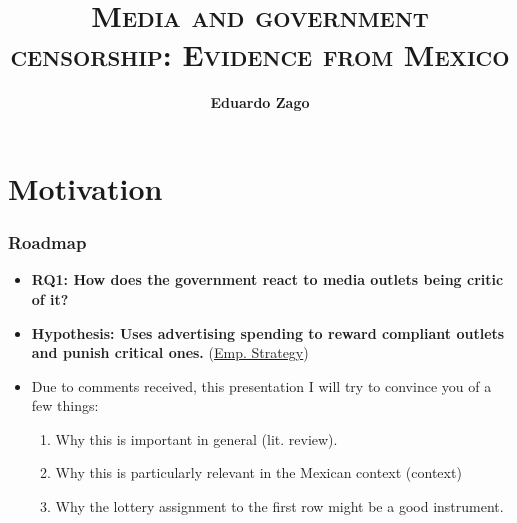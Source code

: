 \documentclass[12pt]{beamer}
\title{\Large\textsc{Media and government censorship: Evidence from Mexico}}
\author[Zago] %
{\textbf{Eduardo Zago}\inst{1}  \vspace{10pt}}
\institute []%
{  \inst{1}   PhD Student NYU Politics}
\date{\textsc{}}
\begin{document}
\maketitle









\section{Motivation}


\begin{frame}
\frametitle{Roadmap}
\label{slide:intro}
\small

\begin{itemize}
    \item \textbf{RQ1: How does the government react to media outlets being critic of it?}
    \item \textbf{Hypothesis: Uses advertising spending to reward compliant outlets and punish critical ones.}  (\hyperlink{slide:lottery}{Emp. Strategy})
    \item Due to comments received, this presentation I will try to convince you of a few things: 
    \begin{enumerate}
        \item Why this is important in general (lit. review).
        \item Why this is particularly relevant in the Mexican context (context)
        \item Why the lottery assignment to the first row might be a good instrument.
    \end{enumerate}
\end{itemize}

\end{frame}
\end{document}

